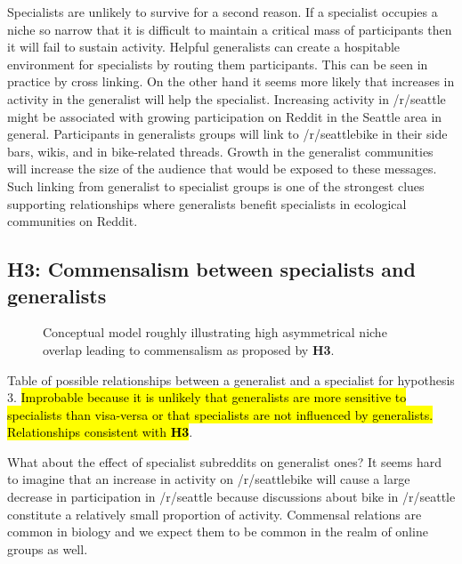 \documentclass[12pt]{memoir}
\DeclareRobustCommand{\myhl}[2]{\sethlcolor{#1} \hl{#2}}
\begin{document}
Specialists are unlikely to survive for a second reason. If a specialist occupies a niche so narrow that it is difficult to maintain a critical mass of participants then it will fail to sustain activity.  Helpful generalists can create a hospitable environment for specialists by routing them participants.  This can be seen in practice by cross linking. On the other hand it seems more likely that increases in activity in the generalist will help the specialist.  Increasing activity in /r/seattle might be associated with growing participation on Reddit in the Seattle area in general.  Participants in generalists groups will link to /r/seattlebike in their side bars, wikis, and in bike-related threads. Growth in the generalist communities will increase the size of the audience that would be exposed to these messages.  Such linking from generalist to specialist groups is one of the strongest clues supporting relationships where generalists benefit specialists in ecological communities on Reddit.

\subsection{\textbf{H3:} Commensalism between specialists and generalists}

\begin{figure}[t]

\caption{Conceptual model roughly illustrating high asymmetrical niche overlap leading to commensalism as proposed by \textbf{H3}. \label{fig:H3}}
\end{figure}

\begin{table}[b]
  
\caption{Table of possible relationships between a generalist and a specialist for hypothesis 3. \myhl{nullhypothesizedcell}{Improbable because it is unlikely that generalists are more sensitive to specialists than visa-versa or that specialists are not influenced by generalists.}  \myhl{hypothesizedcell}{Relationships consistent with \textbf{H3}}. \label{tab:H3}}
\end{table}


What about the effect of specialist subreddits on generalist ones?  It seems hard to imagine that an increase in activity on /r/seattlebike will cause a large decrease in participation in /r/seattle because discussions about bike in /r/seattle constitute a relatively small proportion of activity.  Commensal relations are common in biology and we expect them to be common in the realm of online groups as well.
\end{document}
